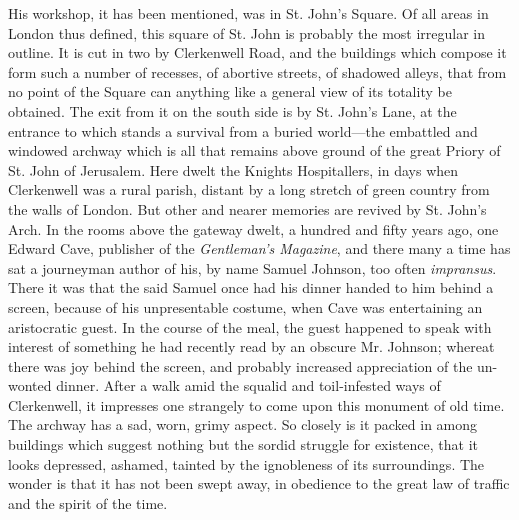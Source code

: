 His workshop, it has been mentioned, was in St. John's Square. Of all
areas in London thus defined, this square of St. John is probably the
most irregular in outline. It is cut in two by Clerkenwell Road, and the
buildings which compose it form such a number of recesses, of abortive
streets, of shadowed alleys, that from no point of the Square can
{\protect\hypertarget{122}{}{}}anything like a general view of its
totality be obtained. The exit from it on the south side is by St.
John's Lane, at the entrance to which stands a survival from a buried
world---the embattled and windowed archway which is all that remains
above ground of the great Priory of St. John of Jerusalem. Here dwelt
the Knights Hospitallers, in days when Clerkenwell was a rural parish,
distant by a long stretch of green country from the walls of London. But
other and nearer memories are revived by St. John's Arch. In the rooms
above the gateway dwelt, a hundred and fifty years ago, one Edward Cave,
publisher of the \emph{Gentleman's Magazine}, and there many a time has
sat a journeyman author of his, by name Samuel Johnson, too often
\emph{impransus}. There it was that the said Samuel once had his dinner
handed to him behind a screen, because of his unpresentable costume,
when Cave was entertaining an aristocratic guest. In the course of the
meal, the guest happened to speak with interest of something he had
recently read by an obscure Mr. Johnson;
{\protect\hypertarget{123}{}{}}whereat there was joy behind the screen,
and probably increased appreciation of the un-wonted dinner. After a
walk amid the squalid and toil-infested ways of Clerkenwell, it
impresses one strangely to come upon this monument of old time. The
archway has a sad, worn, grimy aspect. So closely is it packed in among
buildings which suggest nothing but the sordid struggle for existence,
that it looks depressed, ashamed, tainted by the ignobleness of its
surroundings. The wonder is that it has not been swept away, in
obedience to the great law of traffic and the spirit of the time.

